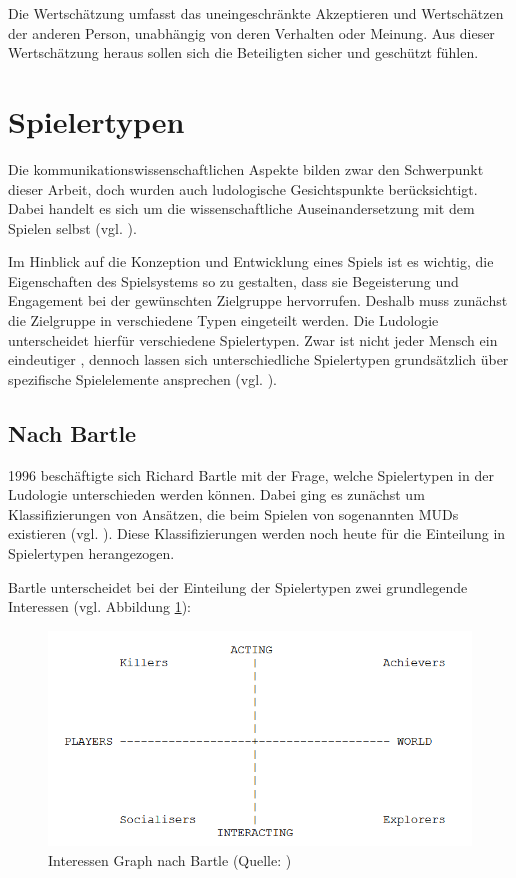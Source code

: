 Die Wertschätzung umfasst das uneingeschränkte Akzeptieren und Wertschätzen der anderen Person, unabhängig von deren Verhalten oder Meinung. Aus dieser Wertschätzung heraus sollen sich die Beteiligten sicher und geschützt fühlen.




\section{Spielertypen}
Die kommunikationswissenschaftlichen Aspekte bilden zwar den Schwerpunkt dieser Arbeit, doch wurden auch ludologische Gesichtspunkte
berücksichtigt. Dabei handelt es sich um die wissenschaftliche Auseinandersetzung mit dem Spielen selbst (vgl. \citealp{institut_fur_ludologie_spielforschung_nodate}). 

Im Hinblick auf die Konzeption und Entwicklung eines Spiels ist es wichtig, die Eigenschaften des Spielsystems so zu gestalten, dass sie Begeisterung und Engagement bei der gewünschten Zielgruppe hervorrufen. Deshalb muss zunächst die Zielgruppe in verschiedene Typen eingeteilt werden. Die Ludologie unterscheidet hierfür verschiedene Spielertypen. Zwar ist nicht jeder Mensch ein eindeutiger , dennoch lassen sich unterschiedliche Spielertypen grundsätzlich über spezifische Spielelemente ansprechen (vgl. \citealp{institut_fur_ludologie_spielertypen_nodate}).

\subsection{Nach Bartle}
1996 beschäftigte sich Richard Bartle mit der Frage, welche Spielertypen in der Ludologie unterschieden werden können. Dabei ging es zunächst um Klassifizierungen von Ansätzen, die beim Spielen von sogenannten \ac{MUD}s existieren (vgl. \cite{bartle_hearts_1996}). Diese Klassifizierungen werden noch heute für die Einteilung in Spielertypen herangezogen.

Bartle unterscheidet bei der Einteilung der Spielertypen zwei grundlegende Interessen (vgl. Abbildung \ref{fig:bartle-muds}):

\begin{figure}[ht]
\centering
\includegraphics[width=1\linewidth]{content/pictures/basic_interests.PNG}
\caption{Interessen Graph nach Bartle (Quelle: \citealp{bartle_hearts_1996})}
\label{fig:bartle-muds}
\end{figure}

